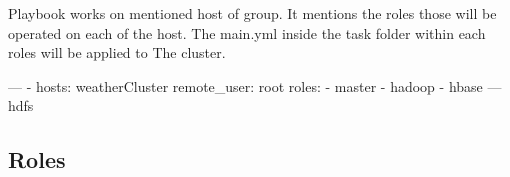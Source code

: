 \documentclass[9pt,twocolumn,twoside]{../../styles/osajnl}
\begin{document}
Playbook works on mentioned host of group. It mentions the roles those will be operated on each of the host. The main.yml  inside the task folder within each roles will be applied to 
The cluster. 

---
- hosts: weatherCluster 
  remote_user: root
  roles:
    - master
    - hadoop
    - hbase
    — hdfs

\subsection{Roles}



 
\end{document}
